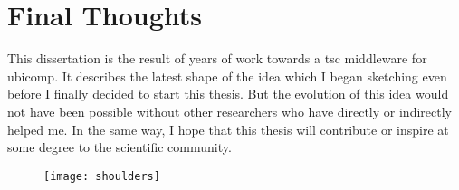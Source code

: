 \section{Final Thoughts}


This dissertation is the result of years of work towards a \acl{tsc} middleware for \acl{ubicomp}.
It describes the latest shape of the idea which I began sketching even before I finally decided to start this thesis.
But the evolution of this idea would not have been possible without other researchers who have directly or indirectly helped me. %
In the same way, I hope that this thesis will contribute or inspire at some degree to the scientific community.

\bigskip

\begin{figure}[h]
    \centering
    \texttt{[image: shoulders]}
    \caption*{}{ }
    \label{fig:shouldersOfGiants}
\end{figure}